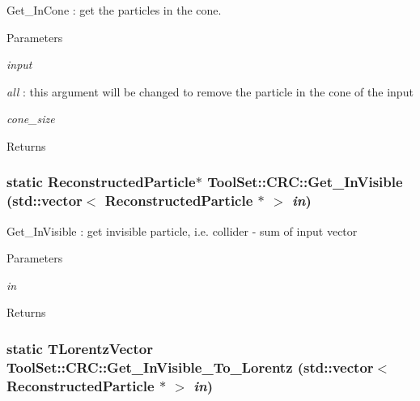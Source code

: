 Get\_\-InCone : get the particles in the cone. 
\begin{DoxyParams}{Parameters}
\item[{\em input}]\item[{\em all}]: this argument will be changed to remove the particle in the cone of the input \item[{\em cone\_\-size}]\end{DoxyParams}
\begin{DoxyReturn}{Returns}

\end{DoxyReturn}
\hypertarget{classToolSet_1_1CRC_a09784c243bc4cd8cefb18e00a1d8301f}{
\subsubsection[{Get\_\-InVisible}]{\setlength{\rightskip}{0pt plus 5cm}static ReconstructedParticle$\ast$ ToolSet::CRC::Get\_\-InVisible (std::vector$<$ ReconstructedParticle $\ast$ $>$ {\em in})}}
\label{classToolSet_1_1CRC_a09784c243bc4cd8cefb18e00a1d8301f}


Get\_\-InVisible : get invisible particle, i.e. collider -\/ sum of input vector


\begin{DoxyParams}{Parameters}
\item[{\em in}]\end{DoxyParams}
\begin{DoxyReturn}{Returns}

\end{DoxyReturn}
\hypertarget{classToolSet_1_1CRC_ad244840d5374b1773ed3f822d9411a5d}{
\subsubsection[{Get\_\-InVisible\_\-To\_\-Lorentz}]{\setlength{\rightskip}{0pt plus 5cm}static TLorentzVector ToolSet::CRC::Get\_\-InVisible\_\-To\_\-Lorentz (std::vector$<$ ReconstructedParticle $\ast$ $>$ {\em in})}}
\label{classToolSet_1_1CRC_ad244840d5374b1773ed3f822d9411a5d}


